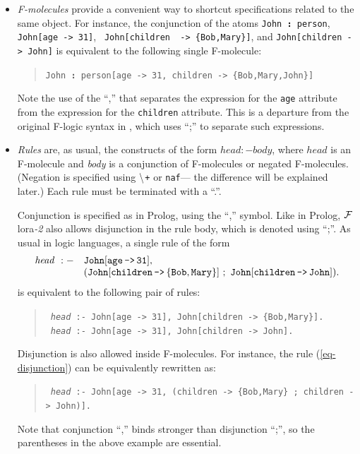 \documentclass[11pt]{article}
\newcommand{\isa}{\,{\bf{:}}\,}
\newcommand{\mvd}{{\mbox{\tt \,->\,}}}  %
\newcommand{\FLORA}{{\mbox{\sc ${\cal F}${lora}\rm\emph{-2}}}\xspace}
\newcommand{\fl}{\mbox{F-logic}\xspace}
\newcommand{\PLGNAF}{\mbox{\tt \ensuremath{\tt\backslash}+}\xspace}
\newcommand{\SILKNAF}{{{\tt naf}}\xspace}
\begin{document}
\begin{itemize}
\item
  \emph{F-molecules} provide a convenient way to shortcut specifications
  related to the same object. For instance, the conjunction of the atoms
  {\tt John{\isa}person}, {\tt John[age{\mvd}31]}, {\tt
  John[children \mvd \{Bob,Mary\}]}, and {\tt John[children\mvd John]}
  is equivalent to the following single F-molecule:
  \begin{quote}
    {\tt John{\isa}person[age{\mvd}31, children\mvd\{Bob,Mary,John\}]} 
  \end{quote}
  Note the use of the ``,'' that separates the expression for the {\tt age}
  attribute from the expression for the {\tt children} attribute. This is a
  departure from the original \fl syntax in \cite{KLW95}, which uses ``;'' 
  to separate such expressions.
  
\item \emph{Rules} are, as usual, the constructs of the form $head :-
  body$, where $head$ is an F-molecule and \emph{body} is a conjunction of
  F-molecules or negated F-molecules. (Negation is specified using {\PLGNAF}
    or \SILKNAF --- the difference will be explained later.)
  Each rule must be terminated with a ``.''.
  
  Conjunction is specified as in Prolog, using the ``,'' symbol. Like in
  Prolog, \FLORA also allows disjunction in the rule body, which is denoted
  using ``;''. As usual in logic languages, a single rule of the form
  \begin{equation}\label{eq-disjunction}
    \begin{array}{rl}
    {\it head}~:- & \tt John[age{\mvd}31],\\
                  & \tt (John[children\mvd\{Bob,Mary\}]~;~ John[children\mvd John]).
    \end{array}
  \end{equation}
  is equivalent to the following pair of rules:
  \begin{quote}
  {\tt
    {\it head}~:-~John[age{\mvd}31],~John[children\mvd\{Bob,Mary\}].
    }
  \\
  {\tt
    {\it head}~:-~John[age{\mvd}31],~John[children\mvd John].
    }
  \end{quote}
  Disjunction is also allowed inside F-molecules. For instance, the rule
  (\ref{eq-disjunction}) can be equivalently rewritten as:
  \begin{quote}
 {\tt
   {\it head}~:-~John[age{\mvd}31,~(children\mvd\{Bob,Mary\}~;~children\mvd John)].
   }
  \end{quote}
  Note that conjunction ``,'' binds stronger than disjunction ``;'', so the
  parentheses in the above example are essential.
  

\end{itemize}
\end{document}
